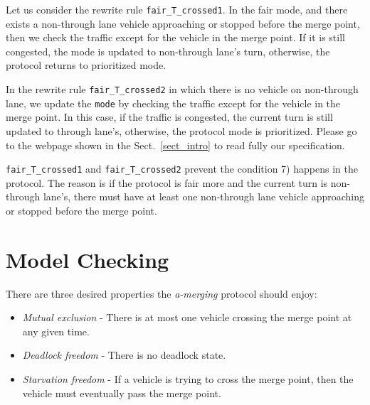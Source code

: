 \documentclass[10pt, conference, compsocconf]{IEEEtran}
\begin{document}
Let us consider the rewrite rule \verb!fair_T_crossed1!.
In the fair mode, and there exists a non-through lane vehicle approaching or stopped before the merge point,
then we check the traffic except for the vehicle in the merge point.
If it is still congested, the mode is updated to non-through lane's turn,
otherwise, the protocol returns to prioritized mode. 

In the rewrite rule \verb!fair_T_crossed2! in which there is no vehicle on non-through lane, 
we update the \verb!mode! by checking the traffic except for the vehicle in the merge point.
In this case, if the traffic is congested, the current turn is still updated to through lane's,
otherwise, the protocol mode is prioritized.
Please go to the webpage shown in the Sect.~\ref{sect_intro} to read fully our specification.
 
\verb!fair_T_crossed1! and \verb!fair_T_crossed2! prevent the condition 7) happens in the protocol.
The reason is if the protocol is fair more and the current turn is non-through lane's,
there must have at least one non-through lane vehicle approaching or stopped before the merge point.

 
\section{Model Checking}
\label{sect_model}
There are three desired properties the \textit{a-merging} protocol should enjoy:
\begin{itemize}
    \item \textit{Mutual exclusion} - There is at most one vehicle crossing the merge point at any given time.
    \item \textit{Deadlock freedom} - There is no deadlock state.
    \item \textit{Starvation freedom} - If a vehicle is trying to cross the merge point, then the vehicle must eventually pass the merge point.
\end{itemize}

\end{document}
